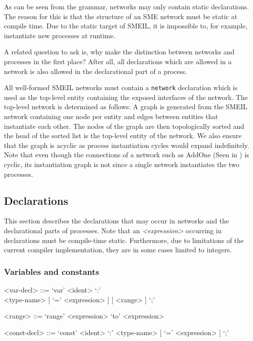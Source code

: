 As can be seen from the grammar, networks may only contain static
declarations. The reason for this is that the structure of an SME network must
be static at compile time. Due to the static target of SMEIL, it is impossible
to, for example, instantiate new processes at runtime.

A related question to ask is, why make the distinction between networks and
processes in the first place? After all, all declarations which are allowed in
a network is also allowed in the declarational part of a process. 



All well-formed SMEIL networks must contain a {\tt network} declaration which is
used as the top-level entity containing the exposed interfaces of the
network. The top-level network is determined as follows: A graph is generated
from the SMEIL network containing one node per entity and edges between entities
that instantiate each other. The nodes of the graph are then topologically
sorted and the head of the sorted list is the top-level entity of the
network. We also ensure that the graph is acyclic as process instantiation
cycles would expand indefinitely. Note that even though the connections of a
network such as AddOne (Seen in ) is cyclic, its
instantiation graph is not since a single network instantiates the two
processes.


\subsection{Declarations}
This section describes the declarations that may occur in {\ttfamily network}s
and the declarational parts of {\ttfamily processe}s. Note that an {\itshape
  <expression>} occurring in declarations must be compile-time
static. Furthermore, due to limitations of the current compiler implementation,
they are in some cases limited to integers.

\subsubsection{Variables and constants}
\begin{grammar}
  <var-decl> ::= `var' <ident> `:' \\ <type-name> [ `=' <expression> ] [ <range> ] `;'

  <range> ::= `range' <expression> `to' <expression>

  <const-decl> ::= `const' <ident> `:' <type-name> [ `=' <expression> ] `;'
\end{grammar}

